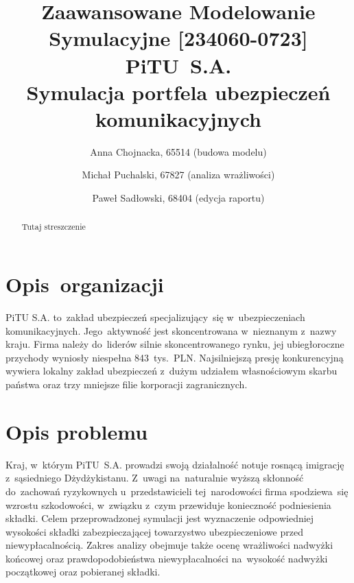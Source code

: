 \documentclass[12pt, a4paper, oneside]{mwart} %
\begin{document}
\title{Zaawansowane Modelowanie Symulacyjne [234060-0723]\\ 
\bigskip
PiTU~S.A.\\
Symulacja portfela ubezpieczeń komunikacyjnych}
\author{Anna Chojnacka, 65514 (budowa modelu) \and
Michał Puchalski, 67827 (analiza wrażliwości) \and
Paweł Sadłowski, 68404 (edycja raportu)}
\maketitle

\begin{abstract}
Tutaj streszczenie
\end{abstract}

\section{Opis~organizacji}
PiTU S.A. to~zakład ubezpieczeń specjalizujący~się w~ubezpieczeniach komunikacyjnych. Jego~aktywność jest skoncentrowana w~nieznanym z~nazwy kraju. Firma należy do~liderów silnie skoncentrowanego rynku, jej ubiegłoroczne przychody wyniosły niespełna 843~tys.~PLN. Najsilniejszą presję konkurencyjną wywiera lokalny zakład ubezpieczeń z~dużym udziałem własnościowym skarbu państwa oraz trzy mniejsze filie korporacji zagranicznych.

\section{Opis problemu}
Kraj, w~którym PiTU~S.A. prowadzi swoją działalność notuje rosnącą imigrację z~sąsiedniego Dżydżykistanu. Z~uwagi na~naturalnie wyższą skłonność do~zachowań ryzykownych u~przedstawicieli tej~narodowości firma spodziewa~się wzrostu szkodowości, w~związku z~czym przewiduje konieczność podniesienia składki. Celem przeprowadzonej symulacji jest wyznaczenie odpowiedniej wysokości składki zabezpieczającej towarzystwo ubezpieczeniowe przed niewypłacalnością. Zakres analizy obejmuje także ocenę wrażliwości nadwyżki końcowej oraz prawdopodobieństwa niewypłacalności na~wysokość nadwyżki początkowej oraz pobieranej składki.
\end{document}

